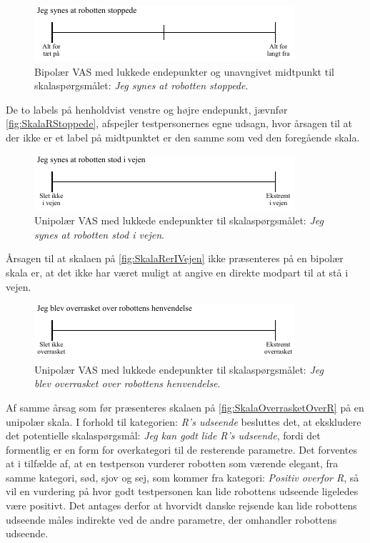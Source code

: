 \newpage  
%
\begin{figure}[H]
\centering
\includegraphics[width =\textwidth]{Figure/UdvalgteSkalaer/RStoppede} 
\caption{Bipolær VAS med lukkede endepunkter og unavngivet midtpunkt til skalaspørgsmålet: \textit{Jeg synes at robotten stoppede}.}
\label{fig:SkalaRStoppede}
\end{figure}
\noindent
%
De to labels på henholdvist venstre og højre endepunkt, jævnfør \autoref{fig:SkalaRStoppede}, afspejler testpersonernes egne udsagn, hvor årsagen til at der ikke er et label på midtpunktet er den samme som ved den foregående skala. 
%
\begin{figure}[H]
\centering
\includegraphics[width =\textwidth]{Figure/UdvalgteSkalaer/RobottenErIVejen} 
\caption{Unipolær VAS med lukkede endepunkter til skalaspørgsmålet: \textit{Jeg synes at robotten stod i vejen}.}
\label{fig:SkalaRerIVejen}
\end{figure}
\noindent
%
Årsagen til at skalaen på \autoref{fig:SkalaRerIVejen} ikke præsenteres på en bipolær skala er, at det ikke har været muligt at angive en direkte modpart til at stå i vejen. 
%
\begin{figure}[H]
\centering
\includegraphics[width =\textwidth]{Figure/UdvalgteSkalaer/OverrasketOverR} 
\caption{Unipolær VAS med lukkede endepunkter til skalaspørgsmålet: \textit{Jeg blev overrasket over robottens henvendelse}.}
\label{fig:SkalaOverrasketOverR}
\end{figure}
\noindent
%
Af samme årsag som før præsenteres skalaen på \autoref{fig:SkalaOverrasketOverR} på en unipolær skala. \blankline
%
I forhold til kategorien: \textit{R's udseende} besluttes det, at ekskludere det potentielle skalaspørgsmål: \textit{Jeg kan godt lide R's udseende}, fordi det formentlig er en form for overkategori til de resterende parametre. Det forventes at i tilfælde af, at en testperson vurderer robotten som værende elegant, fra samme kategori, sød, sjov og sej, som kommer fra kategori: \textit{Positiv overfor R}, så vil en vurdering på hvor godt testpersonen kan lide robottens udseende ligeledes være positivt. Det antages derfor at hvorvidt danske rejsende kan lide robottens udseende måles indirekte ved de andre parametre, der omhandler robottens udseende.

